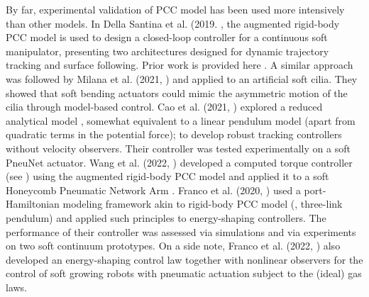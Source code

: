 By far, experimental validation of PCC model has been used more intensively than other models. In Della Santina et al. (2019. \cite{DellaSantina2020a}, the augmented rigid-body PCC model is used to design a closed-loop controller for a continuous soft manipulator, presenting two architectures designed for dynamic trajectory tracking and surface following. Prior work is provided here \cite{Katzschmann2019}. A similar approach was followed by Milana et al. (2021, \cite{Milana2021Apr}) and applied to an artificial soft cilia. They showed that soft bending actuators could mimic the asymmetric motion of the cilia through model-based control. Cao et al. (2021, \cite{Cao2021Apr}) explored a reduced analytical model \cite{Wang2019Apr}, somewhat equivalent to a linear pendulum model (apart from quadratic terms in the potential force); to develop robust tracking controllers without velocity observers. Their controller was tested experimentally on a soft PneuNet actuator. Wang et al. (2022, \cite{Wang2022Mar}) developed a computed torque controller (see \cite{Spong2006}) using the augmented rigid-body PCC model and applied it to a soft Honeycomb Pneumatic Network Arm \cite{Jiang2016Dec}. Franco et al. (2020, \cite{Franco2020,Franco2020Jan}) used a port-Hamiltonian modeling framework akin to rigid-body PCC model (\ie, three-link pendulum) and applied such principles to energy-shaping controllers. The performance of their controller was assessed via simulations and via experiments on two soft continuum prototypes. On a side note, Franco et al. (2022, \cite{Franco2022May}) also developed an energy-shaping control law together with nonlinear observers for the control of soft growing robots \cite{Hawkes2017} with pneumatic actuation subject to the (ideal) gas laws.

